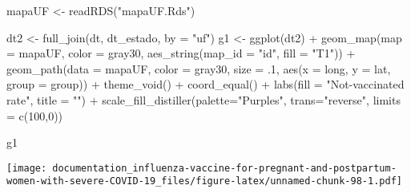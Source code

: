 \documentclass[
]{article}
\newenvironment{Shaded}{\begin{snugshade}}{\end{snugshade}}
\newcommand{\AttributeTok}[1]{\textcolor[rgb]{0.77,0.63,0.00}{#1}}
\newcommand{\DecValTok}[1]{\textcolor[rgb]{0.00,0.00,0.81}{#1}}
\newcommand{\FunctionTok}[1]{\textcolor[rgb]{0.00,0.00,0.00}{#1}}
\newcommand{\NormalTok}[1]{#1}
\newcommand{\OtherTok}[1]{\textcolor[rgb]{0.56,0.35,0.01}{#1}}
\newcommand{\SpecialCharTok}[1]{\textcolor[rgb]{0.00,0.00,0.00}{#1}}
\newcommand{\StringTok}[1]{\textcolor[rgb]{0.31,0.60,0.02}{#1}}
\begin{document}
\begin{Shaded}
\begin{Highlighting}[]
\NormalTok{mapaUF }\OtherTok{\textless{}{-}} \FunctionTok{readRDS}\NormalTok{(}\StringTok{"mapaUF.Rds"}\NormalTok{)}

\NormalTok{dt2 }\OtherTok{\textless{}{-}} \FunctionTok{full\_join}\NormalTok{(dt, dt\_estado, }\AttributeTok{by =} \StringTok{"uf"}\NormalTok{)}
\NormalTok{g1 }\OtherTok{\textless{}{-}} \FunctionTok{ggplot}\NormalTok{(dt2) }\SpecialCharTok{+}
  \FunctionTok{geom\_map}\NormalTok{(}\AttributeTok{map =}\NormalTok{ mapaUF, }\AttributeTok{color =} \StringTok{\textquotesingle{}gray30\textquotesingle{}}\NormalTok{, }\FunctionTok{aes\_string}\NormalTok{(}\AttributeTok{map\_id =} \StringTok{"id"}\NormalTok{, }\AttributeTok{fill =} \StringTok{"T1"}\NormalTok{)) }\SpecialCharTok{+}
  \FunctionTok{geom\_path}\NormalTok{(}\AttributeTok{data =}\NormalTok{ mapaUF, }\AttributeTok{color =} \StringTok{\textquotesingle{}gray30\textquotesingle{}}\NormalTok{, }\AttributeTok{size =}\NormalTok{ .}\DecValTok{1}\NormalTok{, }\FunctionTok{aes}\NormalTok{(}\AttributeTok{x =}\NormalTok{ long, }\AttributeTok{y =}\NormalTok{ lat, }\AttributeTok{group =}\NormalTok{ group)) }\SpecialCharTok{+} 
  \FunctionTok{theme\_void}\NormalTok{() }\SpecialCharTok{+} \FunctionTok{coord\_equal}\NormalTok{() }\SpecialCharTok{+} 
  \FunctionTok{labs}\NormalTok{(}\AttributeTok{fill =} \StringTok{"Not{-}vaccinated rate"}\NormalTok{, }\AttributeTok{title =} \StringTok{""}\NormalTok{)  }\SpecialCharTok{+} 
  \FunctionTok{scale\_fill\_distiller}\NormalTok{(}\AttributeTok{palette=}\StringTok{"Purples"}\NormalTok{, }\AttributeTok{trans=}\StringTok{"reverse"}\NormalTok{, }\AttributeTok{limits =} \FunctionTok{c}\NormalTok{(}\DecValTok{100}\NormalTok{,}\DecValTok{0}\NormalTok{)) }

\NormalTok{g1}
\end{Highlighting}
\end{Shaded}

\texttt{[image: documentation\_influenza-vaccine-for-pregnant-and-postpartum-women-with-severe-COVID-19\_files/figure-latex/unnamed-chunk-98-1.pdf]}
\end{document}
